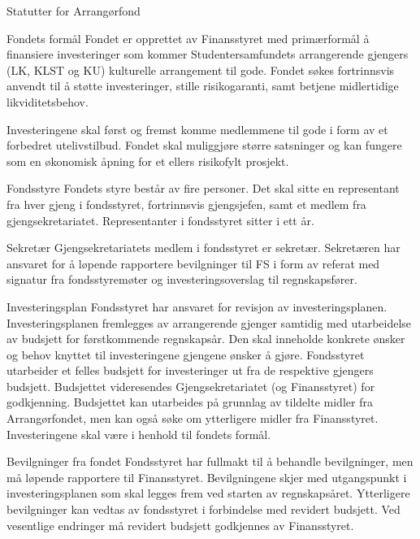 \begin{fond}{Statutter for Arrangørfond}
  \begin{fondsparagraf}{Fondets formål}
Fondet er opprettet av Finansstyret med primærformål å finansiere investeringer som kommer Studentersamfundets
arrangerende gjengers (LK, KLST og KU) kulturelle arrangement til gode. Fondet søkes fortrinnsvis anvendt til å
støtte investeringer, stille risikogaranti, samt betjene midlertidige likviditetsbehov.

Investeringene skal først og fremst komme medlemmene til gode i form av et forbedret utelivstilbud. Fondet skal
muliggjøre større satsninger og kan fungere som en økonomisk åpning for et ellers risikofylt prosjekt.
  \end{fondsparagraf}
  
  \begin{fondsparagraf}{Fondsstyre}
Fondets styre består av fire personer. Det skal sitte en representant fra hver gjeng i fondsstyret, fortrinnsvis
gjengsjefen, samt et medlem fra gjengsekretariatet. Representanter i fondsstyret sitter i ett år.
  \end{fondsparagraf}
  
  \begin{fondsparagraf}{Sekretær}
Gjengsekretariatets medlem i fondsstyret er sekretær. Sekretæren har ansvaret for å løpende rapportere bevilgninger til
FS i form av referat med signatur fra fondsstyremøter og investeringsoverslag til regnskapsfører.
  \end{fondsparagraf}
  
  \begin{fondsparagraf}{Investeringsplan}
Fondsstyret har ansvaret for revisjon av investeringsplanen. Investeringsplanen fremlegges av arrangerende gjenger
samtidig med utarbeidelse av budsjett for førstkommende regnskapsår. Den skal inneholde konkrete ønsker og behov
knyttet til investeringene gjengene ønsker å gjøre. Fondsstyret utarbeider et felles budsjett for investeringer ut fra de
respektive gjengers budsjett. Budsjettet videresendes Gjengsekretariatet (og Finansstyret) for godkjenning. Budsjettet
kan utarbeides på grunnlag av tildelte midler fra Arrangørfondet, men kan også søke om ytterligere midler fra
Finansstyret. Investeringene skal være i henhold til fondets formål.
  \end{fondsparagraf}
  
  \begin{fondsparagraf}{Bevilgninger fra fondet}
Fondsstyret har fullmakt til å behandle bevilgninger, men må løpende rapportere til Finansstyret. Bevilgningene skjer
med utgangspunkt i investeringsplanen som skal legges frem ved starten av regnskapsåret. Ytterligere bevilgninger
kan vedtas av fondsstyret i forbindelse med revidert budsjett. Ved vesentlige endringer må revidert budsjett
godkjennes av Finansstyret.
  \end{fondsparagraf}
  

\end{fond}
